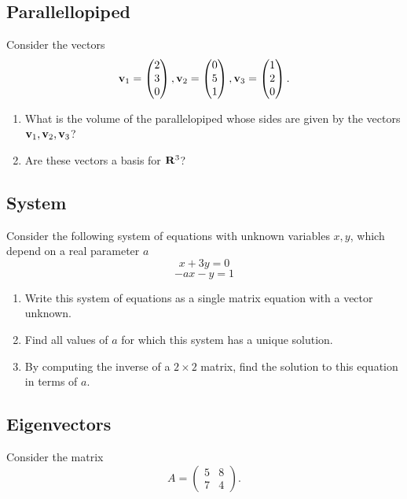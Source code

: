 \documentclass[11pt]{amsart}
\begin{document}
\subsection{Parallellopiped}
Consider the vectors
\[ {\bf v}_1 = \begin{pmatrix} 2 \\ 3 \\ 0 \end{pmatrix},  {\bf v}_2 = \begin{pmatrix} 0 \\ 5 \\ 1 \end{pmatrix},  {\bf v}_3 = \begin{pmatrix} 1 \\ 2 \\ 0 \end{pmatrix}.\]

\begin{enumerate}
\item What is the volume of the parallelopiped whose sides are given by the vectors ${\bf v}_1, {\bf v}_2, {\bf v}_3$?
\item Are these vectors a basis for ${\bf R}^3$?
\end{enumerate}

\subsection{System}
Consider the following system of equations with unknown variables $x,y$, which depend on a real parameter $a$
$$
x + 3y = 0$$
$$-ax - y = 1$$

\begin{enumerate}
\item Write this system of equations as a single matrix equation with a vector unknown.
\item Find all values of $a$ for which this system has a unique solution.
\item By computing the inverse of a $2\times 2$ matrix, find the solution to this equation in terms of $a$.
\end{enumerate}

\subsection{Eigenvectors}
Consider the matrix
$$
A = \begin{pmatrix} 5 & 8 \\ 7 & 4 \end{pmatrix}.
$$
\end{document}
